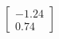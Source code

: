 \documentclass[preview]{standalone}
\begin{document}
\begin{align*}
\begin{bmatrix} -1.24 \\ 0.74 \end{bmatrix}
\end{align*}
\end{document}
